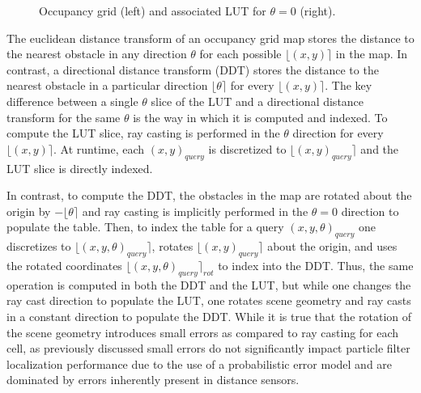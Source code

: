 \documentclass[letterpaper, 10 pt, conference]{ieeeconf}  %
\newcommand{\gridScale}{1.25}
\begin{document}
\begin{figure}[h]
\begin{center}
\end{center}
\caption{Occupancy grid (left) and associated LUT for $\theta=0$ (right).}
\label{cardinal_example}
\end{figure}

The euclidean distance transform of an occupancy grid map stores the distance to the nearest obstacle in any direction $\theta$ for each possible $\lfloor(x,y)\rceil$ in the map. In contrast, a directional distance transform (DDT) stores the distance to the nearest obstacle in a particular direction $\lfloor\theta\rceil$ for every $\lfloor(x,y)\rceil$. The key difference between a single $\theta$ slice of the LUT and a directional distance transform for the same $\theta$ is the way in which it is computed and indexed. To compute the LUT slice, ray casting is performed in the $\theta$ direction for every $\lfloor(x,y)\rceil$. At runtime, each $(x,y)_{query}$ is discretized to $\lfloor(x,y)_{query}\rceil$ and the LUT slice is directly indexed.

In contrast, to compute the DDT, the obstacles in the map are rotated about the origin by $-\lfloor\theta\rceil$ and ray casting is implicitly performed in the $\theta=0$ direction to populate the table. Then, to index the table for a query $(x,y,\theta)_{query}$ one discretizes to $\lfloor(x,y,\theta)_{query}\rceil$, rotates $\lfloor(x,y)_{query}\rceil$ about the origin, and uses the rotated coordinates $\lfloor(x,y,\theta)_{query}\rceil_{rot}$ to index into the DDT. Thus, the same operation is computed in both the DDT and the LUT, but while one changes the ray cast direction to populate the LUT, one rotates scene geometry and ray casts in a constant direction to populate the DDT. While it is true that the rotation of the scene geometry introduces small errors as compared to ray casting for each cell, as previously discussed small errors do not significantly impact particle filter localization performance due to the use of a probabilistic error model and are dominated by errors inherently present in distance sensors. 
\end{document}
